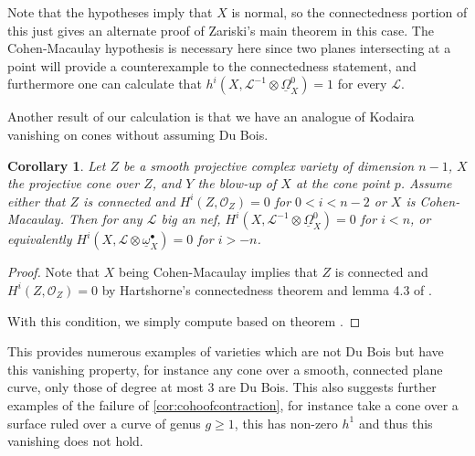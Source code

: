 \documentclass[proquest]{uwthesis}[2014/11/13]
\newtheorem{cor}[theorem]{Corollary}
\theoremstyle{definition}
\newcommand{\LL}{\mathcal{L}}
\newcommand{\OO}{\mathcal{O}}
\newcommand{\DB}{\underline{\Omega}}
\newcommand{\db}{\underline{\omega}^\bullet}
\begin{document}
Note that the hypotheses imply that $X$ is normal, so the connectedness portion of this just gives an alternate proof of Zariski's main theorem in this case.
The Cohen-Macaulay hypothesis is necessary here since two planes intersecting at a point will provide a counterexample to the connectedness statement, and furthermore one can calculate that $h^i(X, \LL^{-1} \otimes \DB_X^0) = 1$ for every $\LL$.

Another result of our calculation is that we have an analogue of Kodaira vanishing on cones without assuming Du Bois.

\begin{cor}
	Let $Z$ be a smooth projective complex variety of dimension $n-1$, $X$ the projective cone over $Z$, and $Y$ the blow-up of $X$ at the cone point $p$.
	Assume either that $Z$ is connected and $H^i(Z, \OO_Z) = 0$ for $0 < i < n-2$ or $X$ is Cohen-Macaulay.
	Then for any $\LL$ big an nef, $H^i(X, \LL^{-1} \otimes \DB_X^0) = 0$ for $i < n$, or equivalently $H^i(X, \LL \otimes \db_X) = 0$ for $i > -n$.
\end{cor}
\begin{proof}
	Note that $X$ being Cohen-Macaulay implies that $Z$ is connected and $H^i(Z, \OO_Z) = 0$ by Hartshorne's connectedness theorem and lemma 4.3 of \cite{Patakfalvi2013}.
	
	With this condition, we simply compute based on theorem \cite{Patakfalvi2013}.
\end{proof}

This provides numerous examples of varieties which are not Du Bois but have this vanishing property, for instance any cone over a smooth, connected plane curve, only those of degree at most 3 are Du Bois.
This also suggests further examples of the failure of \ref{cor:cohoofcontraction}, for instance take a cone over a surface ruled over a curve of genus $g \geq 1$, this has non-zero $h^1$ and thus this vanishing does not hold.

{}

\end{document}
